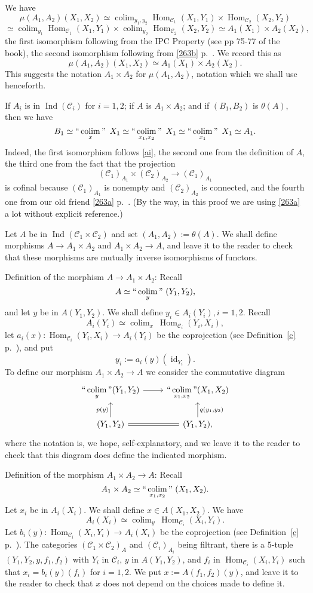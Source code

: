 \documentclass[12pt]{article}
\theoremstyle{remark}
\theoremstyle{definition}
\newcommand{\C}{\mathcal C}
\DeclareMathOperator*{\coli}{colim}
\DeclareMathOperator*{\co}{colim}
\DeclareMathOperator*{\ic}{``\coli"}
\DeclareMathOperator{\id}{id}
\DeclareMathOperator{\Hom}{Hom}%
\DeclareMathOperator{\Ind}{Ind}
\begin{document}
We have 
$$
\mu(A_1,A_2)(X_1,X_2)\simeq\co_{y_1,y_2}\Hom_{\C_1}(X_1,Y_1)\times\Hom_{\C_2}(X_2,Y_2)
$$
$$
\simeq\co_{y_1}\Hom_{\C_1}(X_1,Y_1)\times\co_{y_2}\Hom_{\C_2}(X_2,Y_2)\simeq A_1(X_1)\times A_2(X_2),
$$ 
the first isomorphism following from the IPC Property (see pp 75-77 of the book), the second isomorphism following from \eqref{263b} p.~\pageref{263b}. We record this as
$$
\mu(A_1,A_2)(X_1,X_2)\simeq A_1(X_1)\times A_2(X_2).
$$
This suggests the notation $A_1\times A_2$ for $\mu(A_1,A_2)$, notation which we shall use henceforth.

If $A_i$ is in $\Ind(\C_i)$ for $i=1,2$; if $A$ is $A_1\times A_2$; and if $(B_1,B_2)$ is $\theta(A)$, then we have 
$$ 
B_1\simeq\ic_x\ X_1\simeq\ic_{x_1,x_2}\ X_1\simeq\ic_{x_1}\ X_1\simeq A_1.
$$ 
Indeed, the first isomorphism follows \eqref{ai}, the second one from the definition of $A$, the third one from the fact that the projection 
$$
(\C_1)_{A_1}\times(\C_2)_{A_2}\to(\C_1)_{A_1}
$$ 
is cofinal because $(\C_1)_{A_1}$ is nonempty and $(\C_2)_{A_2}$ is connected, and the fourth one from our old friend \eqref{263a} p.~\pageref{263a}. (By the way, in this proof we are using \eqref{263a} a lot without explicit reference.)

Let $A$ be in $\Ind(\C_1\times\C_2)$ and set $(A_1,A_2):=\theta(A)$. We shall define morphisms $A\to A_1\times A_2$ and $A_1\times A_2\to A$, and leave it to the reader to check that these morphisms are mutually inverse isomorphisms of functors. 

Definition of the morphism $A\to A_1\times A_2$: Recall 
$$
A\simeq\ic_y\ (Y_1,Y_2), 
$$ 
and let $y$ be in $A(Y_1,Y_2)$. We shall define $y_i\in A_i(Y_i),i=1,2$. Recall 
$$
A_i(Y_i)\simeq\co_x\ \Hom_{\C_i}(Y_i,X_i), 
$$ 
let $a_i(x):\Hom_{\C_i}(Y_i,X_i)\to A_i(Y_i)$ be the coprojection (see Definition~\ref{c} p.~\pageref{c}), and put 
$$
y_i:=a_i(y)(\id_{Y_i}). 
$$ 
To define our morphism $A_1\times A_2\to A$ we consider the commutative diagram
$$
\begin{tikzcd}
\displaystyle\ic_y(Y_1,Y_2)\ar{r}&\displaystyle\ic_{x_1,x_2}(X_1,X_2)\\ 
(Y_1,Y_2)\ar{u}{p(y)}\ar[equal]{r}&(Y_1,Y_2),\ar{u}[swap]{q(y_1,y_2)}
\end{tikzcd}
$$ 
where the notation is, we hope, self-explanatory, and we leave it to the reader to check that this diagram does define the indicated morphism.

Definition of the morphism $A_1\times A_2\to A$: Recall 
$$
A_1\times A_2\simeq\ic_{x_1,x_2}\ (X_1,X_2). 
$$ 
Let $x_i$ be in $A_i(X_i)$. We shall define $x\in A(X_1,X_2)$. We have 
$$
A_i(X_i)\simeq\co_y\ \Hom_{\C_i}(X_i,Y_i). 
$$
Let $b_i(y):\Hom_{\C_i}(X_i,Y_i)\to A_i(X_i)$ be the coprojection (see Definition~\ref{c} p.~\pageref{c}). The categories $(\C_1\times\C_2)_A$ and $(\C_i)_{A_i}$ being filtrant, there is a 5-tuple $(Y_1,Y_2,y,f_1,f_2)$ with $Y_i$ in $\C_i$, $y$ in $A(Y_1,Y_2)$, and $f_i$ in $\Hom_{\C_i}(X_i,Y_i)$ such that $x_i=b_i(y)(f_i)$ for $i=1,2$. We put $x:=A(f_1,f_2)(y)$, and leave it to the reader to check that $x$ does not depend on the choices made to define it.
\end{document}
